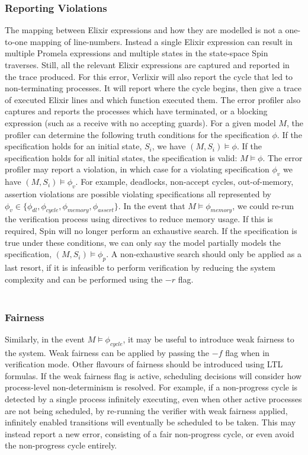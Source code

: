 \subsubsection{Reporting Violations}
The mapping between Elixir expressions and how they are modelled is not a one-to-one mapping of line-numbers. Instead a single Elixir expression can result in multiple Promela expressions and multiple states in the state-space Spin traverses. Still, all the relevant Elixir expressions are captured and reported in the trace produced. For this error, Verlixir will also report the cycle that led to non-terminating processes. It will report where the cycle begins, then give a trace of executed Elixir lines and which function executed them. The error profiler also captures and reports the processes which have terminated, or a blocking expression (such as a receive with no accepting guards). For a given model $M$, the profiler can determine the following truth conditions for the specification $\phi$. If the specification holds for an initial state, $S_i$, we have $(M, S_i) \models \phi$. If the specification holds for all initial states, the specification is valid: $M \models \phi$. The error profiler may report a violation, in which case for a violating specification $\phi _v$ we have $(M, S_i) \models \phi _v$. For example, deadlocks, non-accept cycles, out-of-memory, assertion violations are possible violating specifications all represented by $\phi _v \in \{\phi _{dl}, \phi _{cycle}, \phi _{memory}, \phi _{assert}\}$. In the event that $M \models \phi _{memory}$, we could re-run the verification process using directives to reduce memory usage. If this is required, Spin will no longer perform an exhaustive search. If the specification is true under these conditions, we can only say the model partially models the specification, $(M, S_i) \models \phi _p$. A non-exhaustive search should only be applied as a last resort, if it is infeasible to perform verification by reducing the system complexity and can be performed using the $-r$ flag. 
\\ \\
\subsubsection{Fairness}
Similarly, in the event $M \models \phi _{cycle}$, it may be useful to introduce weak fairness to the system. Weak fairness can be applied by passing the $-f$ flag when in verification mode. Other flavours of fairness should be introduced using LTL formulas. If the weak fairness flag is active, scheduling decisions will consider how process-level non-determinism is resolved. For example, if a non-progress cycle is detected by a single process infinitely executing, even when other active processes are not being scheduled, by re-running the verifier with weak fairness applied, infinitely enabled transitions will eventually be scheduled to be taken. This may instead report a new error, consisting of a fair non-progress cycle, or even avoid the non-progress cycle entirely.  
